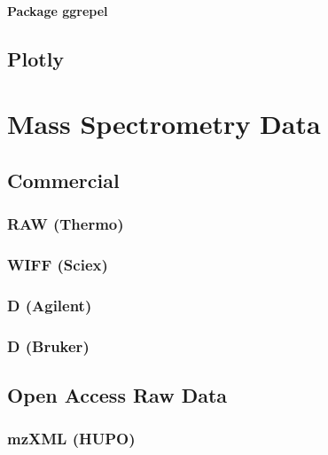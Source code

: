 \documentclass[
]{book}
\begin{document}
\hypertarget{package-ggrepel}{%
\subsubsection{Package ggrepel}\label{package-ggrepel}}

\hypertarget{plotly}{%
\section{Plotly}\label{plotly}}

\hypertarget{mass-spectrometry-data}{%
\chapter{Mass Spectrometry Data}\label{mass-spectrometry-data}}

\hypertarget{commercial}{%
\section{Commercial}\label{commercial}}

\hypertarget{raw-thermo}{%
\subsection{RAW (Thermo)}\label{raw-thermo}}

\hypertarget{wiff-sciex}{%
\subsection{WIFF (Sciex)}\label{wiff-sciex}}

\hypertarget{d-agilent}{%
\subsection{D (Agilent)}\label{d-agilent}}

\hypertarget{d-bruker}{%
\subsection{D (Bruker)}\label{d-bruker}}

\hypertarget{open-access-raw-data}{%
\section{Open Access Raw Data}\label{open-access-raw-data}}

\hypertarget{mzxml-hupo}{%
\subsection{mzXML (HUPO)}\label{mzxml-hupo}}
\end{document}
